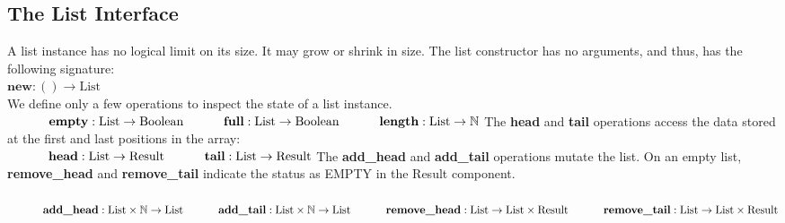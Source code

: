 \documentclass[10pt]{article}
\begin{document}
  \subsection{The List Interface}
  \noindent A list instance has no logical limit on its size. It may grow or shrink in size. The list constructor has no arguments, and thus, has the following signature:
  \vspace*{6pt}\\\hspace*{32pt}\(
  \textbf{new}: \mathbf{()} \rightarrow \mathrm{List}
  \)\vspace*{6pt}\\
  We define only a few operations to inspect the state of a list instance.
  \vspace*{6pt}\\\(
      \hspace*{32pt}\textbf{empty}: \mathrm{List} \rightarrow \mathrm{Boolean}\vspace*{6pt}\\
      \hspace*{32pt}\textbf{full}: \mathrm{List} \rightarrow \mathrm{Boolean}\vspace*{6pt}\\
      \hspace*{32pt}\textbf{length}:\mathrm{List} \rightarrow \mathbb{N}\vspace*{6pt}\\
  \)
The \textbf{head} and \textbf{tail} operations access the data stored at the first and last positions in the array: 
\vspace*{6pt}\\\(
      \hspace*{32pt}\textbf{head}: \mathrm{List} \rightarrow \mathrm{Result}\vspace*{6pt}\\
      \hspace*{32pt}\textbf{tail}: \mathrm{List} \rightarrow \mathrm{Result}\vspace*{6pt}\\
\)
The \textbf{add\_head} and \textbf{add\_tail} operations mutate the list. On an empty list, \textbf{remove\_head} and \textbf{remove\_tail} indicate the status as EMPTY in the Result component.\\
\vspace*{4pt}\\\(
     \hspace*{32pt}\textbf{add\_head}: \mathrm{List} \times \mathbb{N} \rightarrow \mathrm{List}\vspace*{6pt}\\
      \hspace*{32pt}\textbf{add\_tail}: \mathrm{List} \times \mathbb{N} \rightarrow \mathrm{List}\vspace*{6pt}\\
      \hspace*{32pt}\textbf{remove\_head}: \mathrm{List} \rightarrow \mathrm{List \times Result}\vspace*{6pt}\\
      \hspace*{32pt}\textbf{remove\_tail}: \mathrm{List} \rightarrow \mathrm{List \times Result}
  \)
  
\end{document}
